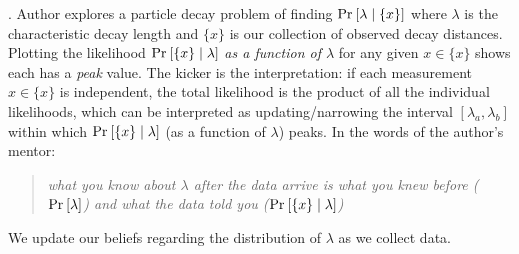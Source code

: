 \documentclass[11pt]{article}
\begin{document}
\p {}. Author explores a particle decay problem of finding $\text{Pr}_{}\left[\lambda \mid \{x\}\right]$ where $\lambda$ is the characteristic decay length and $\{x\}$ is our collection of observed decay distances. Plotting the likelihood $\text{Pr}_{}\left[\{x\} \mid \lambda\right]$ \textit{as a function of $\lambda$} for any given $x \in \{x\}$ shows each has a \textit{peak} value. The kicker is the interpretation: if each measurement $x \in \{x\}$ is independent, the total likelihood is the product of all the individual likelihoods, which can be interpreted as updating/narrowing the interval $[\lambda_a, \lambda_b]$ within which $\text{Pr}_{}\left[\{x\} \mid \lambda\right]$ (as a function of $\lambda$) peaks. In the words of the author's mentor:
\begin{quote}
	{\itshape what you know about $\lambda$ after the data arrive is what you knew before ($\text{Pr}_{}\left[\lambda\right]$) and what the data told you ($\text{Pr}_{}\left[\{x\} \mid \lambda\right]$)}
\end{quote}
We update our beliefs regarding the distribution of $\lambda$ as we collect data.
\end{document}
